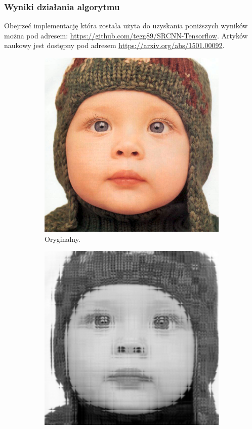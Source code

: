 \documentclass[a4paper,11pt, notitlepage ]{article}
\begin{document}
 \newpage
	 \subsubsection{Wyniki działania algorytmu}
	  Obejrzeć implementację która została użyta do uzyskania poniższych wyników można pod adresem:  \url{https://github.com/tegg89/SRCNN-Tensorflow}. Artyków naukowy jest dostępny pod adresem \url{https://arxiv.org/abs/1501.00092}. 
	 \begin{figure}[h!]
	 	\centering
	 	\begin{subfigure}[b]{0.4\linewidth}
	 		\includegraphics[width=\linewidth]{baby_GT.png}
	 		\caption{Oryginalny.}
	 	\end{subfigure}
	 	\begin{subfigure}[b]{0.4\linewidth}
	 		\includegraphics[width=\linewidth]{SRCNN_test.png}

\end{subfigure}
\end{figure}
\end{document}
